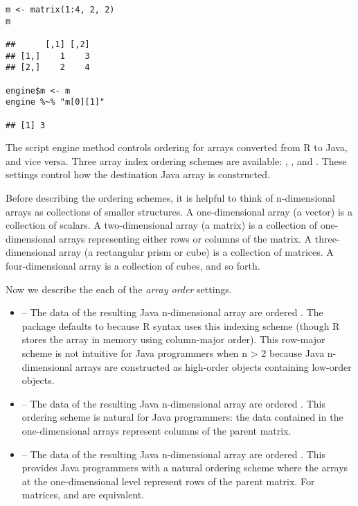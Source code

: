 \begin{verbatim}
m <- matrix(1:4, 2, 2)
m

##      [,1] [,2]
## [1,]    1    3
## [2,]    2    4

engine$m <- m
engine %~% "m[0][1]"

## [1] 3
\end{verbatim}

The  script engine method controls ordering for arrays converted from R to Java, and vice versa. Three array index ordering schemes are available: , , and . These settings control how the destination Java array is constructed.

Before describing the ordering schemes, it is helpful to think of n-dimensional arrays as collections of smaller structures. A one-dimensional array (a vector) is a collection of scalars. A two-dimensional array (a matrix) is a collection of one-dimensional arrays representing either rows or columns of the matrix. A three-dimensional array (a rectangular prism or cube) is a collection of matrices. A four-dimensional array is a collection of cubes, and so forth. 

Now we describe the each of the \textit{array order} settings.

\begin{itemize}
\item {} -- The data of the resulting Java n-dimensional array are ordered \newline {}. The  package defaults to  because R syntax uses this indexing scheme (though R stores the array in memory using column-major order). This row-major scheme is not intuitive for Java programmers when n > 2 because Java n-dimensional arrays are constructed as high-order objects containing low-order objects.

\item {} -- The data of the resulting Java n-dimensional array are ordered \newline {}. This ordering scheme is natural for Java programmers: the data contained in the one-dimensional arrays represent columns of the parent matrix.

\item {} -- The data of the resulting Java n-dimensional array are ordered \newline {}. This provides Java programmers with a natural ordering scheme where the arrays at the one-dimensional level represent rows of the parent matrix. For matrices,  and  are equivalent.

\end{itemize}

